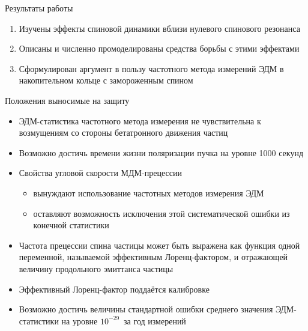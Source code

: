 \documentclass[14pt]{beamer}
\begin{document}
\begin{frame}{Результаты работы}
	\begin{enumerate}
		\item Изучены эффекты спиновой динамики вблизи нулевого спинового резонанса
		\item Описаны и численно промоделированы средства борьбы с этими эффектами
		\item Сформулирован аргумент в пользу частотного метода измерений ЭДМ в накопительном кольце с замороженным спином
	\end{enumerate}
\end{frame}

\begin{frame}{Положения выносимые на защиту}
\begin{itemize}
	\item ЭДМ-статистика частотного метода измерения не чувствительна к возмущениям со стороны бетатронного движения частиц
	\item Возможно достичь времени жизни поляризации пучка на уровне 1000 секунд
	\item Свойства угловой скорости МДМ-прецессии 
	\begin{itemize}
		\item вынуждают использование частотных методов измерения ЭДМ
		\item оставляют возможность исключения этой систематической ошибки из конечной статистики
	\end{itemize}
\end{itemize}
\end{frame}
\begin{frame}
\begin{itemize}
\item Частота прецессии спина частицы может быть выражена как функция одной переменной, называемой эффективным Лоренц-фактором, и отражающей величину продольного эмиттанса частицы
\item Эффективный Лоренц-фактор поддаётся калибровке
\item Возможно достичь величины стандартной ошибки среднего значения ЭДМ-статистики на уровне $10^{-29}$\ecm~за год измерений
\end{itemize}
\end{frame}

\end{document}
